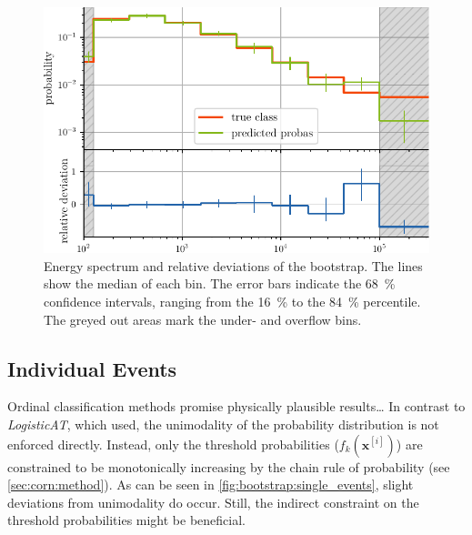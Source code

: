 \begin{figure}
  \centering
  \includegraphics[scale=1]{content/plots/bootstrap:spectrum_full.pdf}
  \caption{
    Energy spectrum and relative deviations of the bootstrap.
    The lines show the median of each bin.
    The error bars indicate the \SI{68}{\percent} confidence intervals,
    ranging from the \SI{16}{\percent} to the \SI{84}{\percent} percentile.
    The greyed out areas mark the under- and overflow bins.
  }
  \label{fig:bootstrap:spectrum}
\end{figure}


\subsection{Individual Events}
Ordinal classification methods promise physically plausible results… %
In contrast to \emph{LogisticAT},
    which \citeauthor{dsea_jan} \cite{dsea_jan} used,
  the unimodality of the probability distribution is not enforced directly.
Instead,
  only the threshold probabilities ($f_k(\mathbf{x}^{[i]})$) are constrained to be monotonically increasing
  by the chain rule of probability
  (see \autoref{sec:corn:method}).
As can be seen in \autoref{fig:bootstrap:single_events},
  slight deviations from unimodality do occur.
Still,
  the indirect constraint on the threshold probabilities
  might be beneficial.

